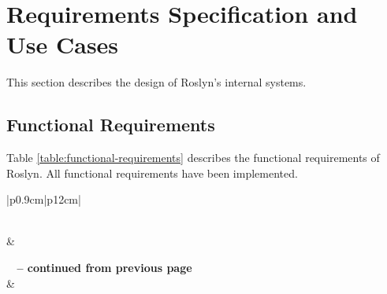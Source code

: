 \documentclass[11pt]{report}
\begin{document}
\section{Requirements Specification and Use Cases}
This section describes the design of Roslyn’s internal systems.
\subsection{Functional Requirements}
Table \ref{table:functional-requirements} describes the functional requirements of Roslyn. All functional requirements have been implemented.

\begin{longtable}{|p{0.9cm}|p{12cm}|}
\caption[The functional requirements of Roslyn]{The functional requirements of Roslyn} 
\label{table:functional-requirements} \\

\hline {} &  \\ \hline 
\endfirsthead

%
{{\bfseries \tablename\ \thetable{} -- continued from previous page}} \\
\hline {} &  \\ \hline 
\endhead

 \\ \hline
\endfoot

\endlastfoot


\end{longtable}
\end{document}
